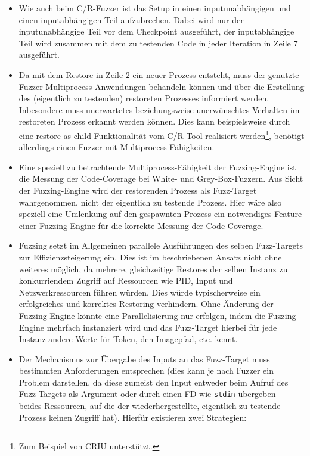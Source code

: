 \documentclass[a4paper]{article}
\begin{document}
\begin{itemize}
    \item Wie auch beim C/R-Fuzzer ist das Setup in einen inputunabhängigen und einen inputabhängigen Teil aufzubrechen. Dabei wird nur der input\-unabhängige Teil vor dem Checkpoint ausgeführt, der inputabhängige Teil wird zusammen mit dem zu testenden Code in jeder Iteration in Zeile 7 ausgeführt.
    \item Da mit dem Restore in Zeile 2 ein neuer Prozess entsteht, muss der genutzte Fuzzer Multiprocess-Anwendungen behandeln können und über die Erstellung des (eigentlich zu testenden) restoreten Prozesses informiert werden. 
        Inbesondere muss unerwartetes beziehungsweise unerwünschtes Verhalten im restoreten Prozess erkannt werden können. 
        Dies kann beispielsweise durch eine restore-as-child Funktionalität vom C/R-Tool realisiert werden\footnote{Zum Beispiel von CRIU unterstützt.}, benötigt allerdings einen Fuzzer mit Multiprocess-Fähigkeiten.
    \item Eine speziell zu betrachtende Multiprocess-Fähigkeit der Fuzzing-Engine ist die Messung der Code-Coverage bei White- und Grey-Box-Fuzzern. Aus Sicht der Fuzzing-Engine wird der restorenden Prozess als Fuzz-Target wahrgenommen, nicht der eigentlich zu testende Prozess. Hier wäre also speziell eine Umlenkung auf den gespawnten Prozess ein notwendiges Feature einer Fuzzing-Engine für die korrekte Messung der Code-Coverage.
    \item Fuzzing setzt im Allgemeinen parallele Ausführungen des selben Fuzz-Targets zur Effizienzsteigerung ein. 
        Dies ist im beschriebenen Ansatz nicht ohne weiteres möglich, da mehrere, gleichzeitige Restores der selben Instanz zu konkurriendem Zugriff auf Ressourcen wie PID, Input und Netzwerkressourcen führen würden. Dies würde typischerweise ein erfolgreiches und korrektes Restoring verhindern. 
        Ohne Änderung der Fuzzing-Engine könnte eine Parallelisierung nur erfolgen, indem die Fuzzing-Engine mehrfach instanziert wird und das Fuzz-Target hierbei für jede Instanz andere Werte für Token, den Imagepfad, etc. kennt.
    \item Der Mechanismus zur Übergabe des Inputs an das Fuzz-Target muss bestimmten Anforderungen entsprechen (dies kann je nach Fuzzer ein Problem darstellen, da diese zumeist den Input entweder beim Aufruf des Fuzz-Targets als Argument oder durch einen FD wie \texttt{stdin} übergeben - beides Ressourcen, auf die der wiederhergestellte, eigentlich zu testende Prozess keinen Zugriff hat). Hierfür existieren zwei Strategien:

\end{itemize}
\end{document}
